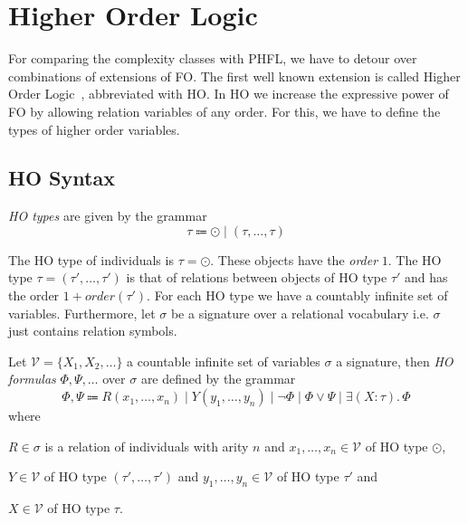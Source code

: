 

\section{Higher Order Logic}\label{sec:higherOrderLogic}

For comparing the complexity classes with PHFL, we have to detour over combinations of extensions of FO. The first well
known extension is called Higher Order Logic~\cite{vanBenthem2001higher}, abbreviated with HO. In HO we
increase the expressive power of FO by allowing relation variables of any order. For this, we have to define the
types of higher order variables.

\subsection{HO Syntax}\label{subsec:hoSyntax}

\begin{definition}
    \emph{HO types} are given by the grammar
    \[ \tau \Coloneqq \odot \mid (\tau, \dots, \tau) \]
\end{definition}

The HO type of individuals is $\tau = \odot$. These objects have the \textit{order} $1$. The HO type $\tau = (\tau',
\dots, \tau')$ is that of relations between objects of HO type $\tau'$ and has the order $1 + order(\tau')$. For
each HO type we have a countably infinite set of variables. Furthermore, let $\sigma$ be a signature over a
relational vocabulary i.e. $\sigma$ just contains relation symbols.

\begin{definition}
    Let $\mathcal{V} = \{X_1, X_2, \dots \}$ a countable infinite set of variables $\sigma$ a signature, then \emph{HO
    formulas} $\Phi, \Psi, \dots$ over $\sigma$ are defined by the grammar
    \[\Phi, \Psi \Coloneqq R(x_1, \dots, x_n) \mid Y(y_1, \dots, y_n) \mid \neg \Phi \mid \Phi \vee \Psi \mid \exists
    (X \colon \tau).\,\Phi\]
    where
    \begin{compactitem}
        \item $R \in \sigma$ is a relation of individuals with arity $n$ and $x_1, \dots, x_n \in \mathcal{V}$ of HO
        type $\odot$,
        \item $Y \in \mathcal{V}$ of HO type $(\tau', \dots, \tau')$ and $y_1, \dots, y_n \in \mathcal{V}$ of HO type
        $\tau'$ and
        \item $X \in \mathcal{V}$ of HO type $\tau$.
    \end{compactitem}
\end{definition}

